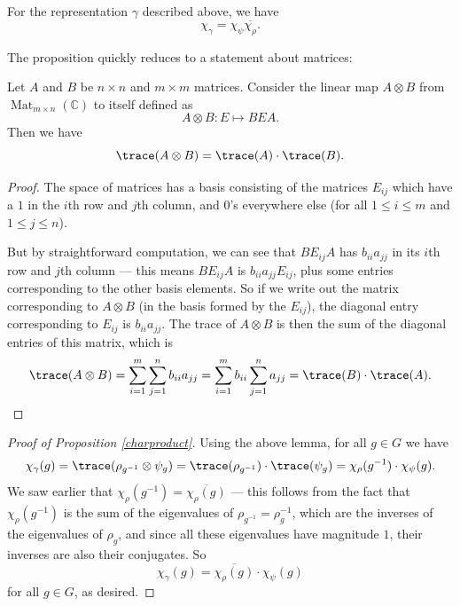 \begin{proposition} \label{charproduct}
    For the representation $\gamma$ described above, we have \[\chi_{\gamma} = \chi_\psi \overline{\chi_\rho}.\] 
\end{proposition}

The proposition quickly reduces to a statement about matrices:

\begin{lemma}
    Let $A$ and $B$ be $n \times n$ and $m \times m$ matrices. Consider the linear map $A \otimes B$ from $\operatorname{Mat}_{m\times n}(\mathbb{C})$ to itself defined as \[A \otimes B : E \mapsto BEA.\] Then we have \[\trace(A\otimes B) = \trace(A) \cdot \trace(B).\] 
\end{lemma}

\begin{proof}
    The space of matrices has a basis consisting of the matrices $E_{ij}$ which have a $1$ in the $i$th row and $j$th column, and $0$'s everywhere else (for all $1 \leq i \leq m$ and $1 \leq j \leq n$).
    
    But by straightforward computation, we can see that $BE_{ij}A$ has $b_{ii}a_{jj}$ in its $i$th row and $j$th column --- this means $BE_{ij}A$ is $b_{ii}a_{jj}E_{ij}$, plus some entries corresponding to the other basis elements. So if we write out the matrix corresponding to $A \otimes B$ (in the basis formed by the $E_{ij}$), the diagonal entry corresponding to $E_{ij}$ is $b_{ii}a_{jj}$. The trace of $A \otimes B$ is then the sum of the diagonal entries of this matrix, which is \[\trace(A \otimes B) = \sum_{i = 1}^m \sum_{j = 1}^n b_{ii}a_{jj} = \sum_{i = 1}^m b_{ii} \sum_{j = 1}^n a_{jj} = \trace(B)\cdot \trace(A). \qedhere\] 
\end{proof}

\begin{proof}[Proof of Proposition \ref{charproduct}] 
    Using the above lemma, for all $g \in G$ we have \[\chi_{\gamma}(g) = \trace(\rho_{g^{-1}} \otimes \psi_g) = \trace(\rho_{g^{-1}})\cdot \trace(\psi_g) = \chi_\rho(g^{-1})\cdot \chi_\psi(g).\] We saw earlier that $\chi_\rho(g^{-1}) = \overline{\chi_\rho(g)}$ --- this follows from the fact that $\chi_\rho(g^{-1})$ is the sum of the eigenvalues of $\rho_{g^{-1}} = \rho_g^{-1}$, which are the inverses of the eigenvalues of $\rho_g$, and since all these eigenvalues have magnitude $1$, their inverses are also their conjugates. So \[\chi_\gamma(g) = \overline{\chi_\rho(g)} \cdot \chi_\psi(g)\] for all $g \in G$, as desired. 
\end{proof}

